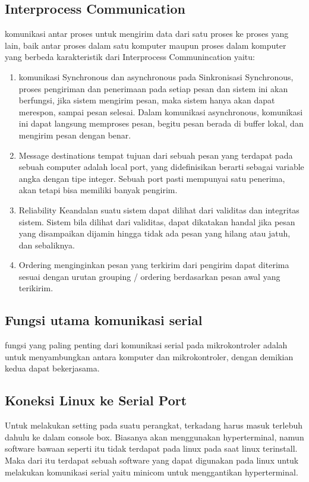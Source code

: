 	\subsection{Interprocess Communication}
	komunikasi antar proses untuk mengirim data dari satu proses ke proses yang lain, baik antar proses dalam satu komputer maupun proses dalam komputer yang berbeda
	karakteristik dari Interprocess Communincation yaitu:
		\begin{enumerate}
			\item komunikasi Synchronous dan asynchronous
				pada Sinkronisasi Synchronous, proses pengiriman dan penerimaan pada setiap pesan dan sistem ini akan berfungsi, jika sistem mengirim pesan, maka sistem hanya akan dapat merespon, sampai pesan selesai. Dalam komunikasi asynchronous, komunikasi ini dapat langsung memproses pesan, begitu pesan berada di buffer lokal, dan mengirim pesan dengan benar.
			\item Message destinations
					tempat tujuan dari sebuah pesan yang terdapat pada  sebuah computer adalah local port, yang didefinisikan berarti sebagai variable angka dengan tipe integer. Sebuah port pasti mempunyai satu penerima, akan tetapi bisa memiliki banyak pengirim.
			\item Reliability
					Keandalan suatu sistem dapat dilihat dari validitas dan integritas sistem.
					Sistem bila dilihat dari validitas, dapat dikatakan handal jika pesan yang disampaikan dijamin hingga tidak ada pesan yang hilang atau jatuh, dan sebaliknya.
			\item Ordering
				  menginginkan pesan yang terkirim dari pengirim dapat diterima sesuai dengan urutan grouping / ordering berdasarkan pesan awal yang terikirim.
		\end{enumerate}

	\subsection{Fungsi utama komunikasi serial}
		fungsi yang paling penting dari komunikasi serial pada mikrokontroler adalah untuk menyambungkan antara komputer dan mikrokontroler, dengan demikian kedua dapat bekerjasama.
	
	\subsection{Koneksi Linux ke Serial Port}
	Untuk melakukan setting pada suatu perangkat, terkadang harus masuk terlebuh dahulu ke dalam console box. Biasanya akan menggunakan hyperterminal, namun software bawaan seperti itu tidak terdapat pada linux pada saat linux terinstall. Maka dari itu terdapat sebuah software yang dapat digunakan pada linux untuk melakukan komunikasi serial yaitu minicom untuk menggantikan hyperterminal.
	
